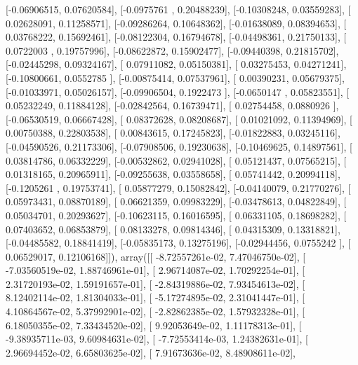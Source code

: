 \documentclass{article}
\begin{document}
       [-0.06906515,  0.07620584],
       [-0.0975761 ,  0.20488239],
       [-0.10308248,  0.03559283],
       [ 0.02628091,  0.11258571],
       [-0.09286264,  0.10648362],
       [-0.01638089,  0.08394653],
       [ 0.03768222,  0.15692461],
       [-0.08122304,  0.16794678],
       [-0.04498361,  0.21750133],
       [ 0.0722003 ,  0.19757996],
       [-0.08622872,  0.15902477],
       [-0.09440398,  0.21815702],
       [-0.02445298,  0.09324167],
       [ 0.07911082,  0.05150381],
       [ 0.03275453,  0.04271241],
       [-0.10800661,  0.0552785 ],
       [-0.00875414,  0.07537961],
       [ 0.00390231,  0.05679375],
       [-0.01033971,  0.05026157],
       [-0.09906504,  0.1922473 ],
       [-0.0650147 ,  0.05823551],
       [ 0.05232249,  0.11884128],
       [-0.02842564,  0.16739471],
       [ 0.02754458,  0.0880926 ],
       [-0.06530519,  0.06667428],
       [ 0.08372628,  0.08208687],
       [ 0.01021092,  0.11394969],
       [ 0.00750388,  0.22803538],
       [ 0.00843615,  0.17245823],
       [-0.01822883,  0.03245116],
       [-0.04590526,  0.21173306],
       [-0.07908506,  0.19230638],
       [-0.10469625,  0.14897561],
       [ 0.03814786,  0.06332229],
       [-0.00532862,  0.02941028],
       [ 0.05121437,  0.07565215],
       [ 0.01318165,  0.20965911],
       [-0.09255638,  0.03558658],
       [ 0.05741442,  0.20994118],
       [-0.1205261 ,  0.19753741],
       [ 0.05877279,  0.15082842],
       [-0.04140079,  0.21770276],
       [ 0.05973431,  0.08870189],
       [ 0.06621359,  0.09983229],
       [-0.03478613,  0.04822849],
       [ 0.05034701,  0.20293627],
       [-0.10623115,  0.16016595],
       [ 0.06331105,  0.18698282],
       [ 0.07403652,  0.06853879],
       [ 0.08133278,  0.09814346],
       [ 0.04315309,  0.13318821],
       [-0.04485582,  0.18841419],
       [-0.05835173,  0.13275196],
       [-0.02944456,  0.0755242 ],
       [ 0.06529017,  0.12106168]]), array([[ -8.72557261e-02,   7.47046750e-02],
       [ -7.03560519e-02,   1.88746961e-01],
       [  2.96714087e-02,   1.70292254e-01],
       [  2.31720193e-02,   1.59191657e-01],
       [ -2.84319886e-02,   7.93454613e-02],
       [  8.12402114e-02,   1.81304033e-01],
       [ -5.17274895e-02,   2.31041447e-01],
       [  4.10864567e-02,   5.37992901e-02],
       [ -2.82862385e-02,   1.57932328e-01],
       [  6.18050355e-02,   7.33434520e-02],
       [  9.92053649e-02,   1.11178313e-01],
       [ -9.38935711e-03,   9.60984631e-02],
       [ -7.72553414e-03,   1.24382631e-01],
       [  2.96694452e-02,   6.65803625e-02],
       [  7.91673636e-02,   8.48908611e-02],
\end{document}
